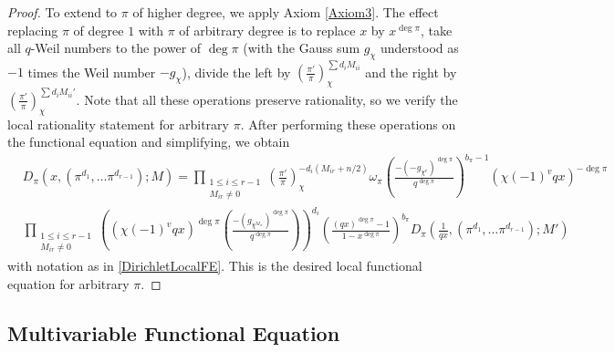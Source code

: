 \documentclass[11pt,letterpaper]{article}
\theoremstyle{definition}
\theoremstyle{remark}
\numberwithin{equation}{section}
\theoremstyle{dotless}
\newcommand{\res}[2]{\left(\frac{#1}{#2}\right)}
\begin{document}
\begin{proof}
To extend to $\pi$ of higher degree, we apply Axiom \ref{Axiom3}. The effect replacing $\pi$ of degree $1$ with $\pi$ of arbitrary degree is to replace $x$ by $x^{\deg \pi}$, take all $q$-Weil numbers to the power of $\deg \pi$ (with the Gauss sum $g_{\chi} $ understood as $-1$ times the Weil number $-g_{\chi} $), divide the left by $\res{\pi'}{\pi}_\chi^{\sum d_i M_{ii}}$ and the right by $\res{\pi'}{\pi}_\chi^{\sum d_i M_{ii}'}$. Note that all these operations preserve rationality, so we verify the local rationality statement for arbitrary $\pi$. After performing these operations on the functional equation and simplifying, we obtain
\begin{equation*} 
\begin{split}
&D_\pi(x, (\pi^{d_1}, \ldots \pi^{d_{r-1}}); M) =\prod_{\substack{1 \leq i \leq r-1 \\ M_{ir} \neq 0}} \res{\pi'}{\pi}_{\chi}^{-d_i (M_{ir}+n/2)} \omega_\pi \left(\frac{-(-g_{\chi^{v}} )^{\deg \pi}}{q^{\deg \pi}}\right)^{b_\pi-1} (\chi(-1)^v q x)^{-\deg \pi}\\ & \prod_{\substack{1 \leq i \leq r-1 \\ M_{ir} \neq 0}} \left((\chi(-1)^{v} q x)^{\deg \pi} \left(\frac{-( g_{\chi^{M_{ir}}} )^{\deg \pi}}{q^{\deg \pi}}\right)\right)^{d_i} \left(\frac{(qx)^{\deg \pi}-1}{1-x^{\deg \pi}}\right)^{b_\pi} D_\pi\left(\frac{1}{qx}, (\pi^{d_1}, \ldots \pi^{d_{r-1}}); M'\right)
\end{split}
\end{equation*}
with notation as in \eqref{DirichletLocalFE}. This is the desired local functional equation for arbitrary $\pi$.
\end{proof}

\subsection{Multivariable Functional Equation}\label{ss-multivariable-functional-equation}
\end{document}
